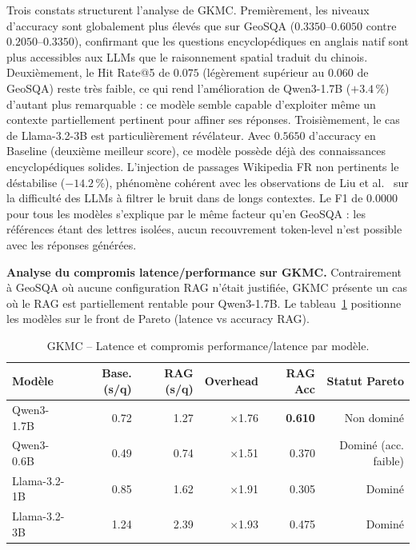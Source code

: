 \documentclass[12pt,a4paper]{article}
\begin{document}
Trois constats structurent l'analyse de GKMC. Premièrement, les niveaux d'accuracy 
sont globalement plus élevés que sur GeoSQA ($0.3350$--$0.6050$ contre 
$0.2050$--$0.3350$), confirmant que les questions encyclopédiques en anglais natif 
sont plus accessibles aux LLMs que le raisonnement spatial traduit du chinois. 
Deuxièmement, le Hit Rate@5 de $0.075$ (légèrement supérieur au $0.060$ de GeoSQA) 
reste très faible, ce qui rend l'amélioration de Qwen3-1.7B ($+3.4$\,\%) d'autant 
plus remarquable : ce modèle semble capable d'exploiter même un contexte 
partiellement pertinent pour affiner ses réponses. Troisièmement, le cas de 
Llama-3.2-3B est particulièrement révélateur. Avec $0.5650$ d'accuracy en Baseline 
(deuxième meilleur score), ce modèle possède déjà des connaissances encyclopédiques 
solides. L'injection de passages Wikipedia FR non pertinents le déstabilise 
($-14.2$\,\%), phénomène cohérent avec les observations de Liu et al.~\cite{liu2023lost} 
sur la difficulté des LLMs à filtrer le bruit dans de longs contextes. Le F1 de 
$0.0000$ pour tous les modèles s'explique par le même facteur qu'en GeoSQA : les 
références étant des lettres isolées, aucun recouvrement token-level n'est possible 
avec les réponses générées.

\medskip

\noindent\textbf{Analyse du compromis latence/performance sur GKMC.}
Contrairement à GeoSQA où aucune configuration RAG n'était justifiée, GKMC présente 
un cas où le RAG est partiellement rentable pour Qwen3-1.7B. Le 
tableau~\ref{tab:pareto_gkmc} positionne les modèles sur le front de Pareto 
(latence vs accuracy RAG).

\begin{table}[H]
\centering
\small
\caption{GKMC -- Latence et compromis performance/latence par modèle.}
\label{tab:pareto_gkmc}
\begin{tabular}{lrrrrr}
\toprule
\textbf{Modèle} & \textbf{Base. (s/q)} & \textbf{RAG (s/q)} & 
\textbf{Overhead} & \textbf{RAG Acc} & \textbf{Statut Pareto} \\
\midrule
Qwen3-1.7B   & 0.72 & 1.27 & $\times$1.76 & \textbf{0.610} & Non dominé \\
Qwen3-0.6B   & 0.49 & 0.74 & $\times$1.51 & 0.370 & Dominé (acc. faible) \\
Llama-3.2-1B & 0.85 & 1.62 & $\times$1.91 & 0.305 & Dominé \\
Llama-3.2-3B & 1.24 & 2.39 & $\times$1.93 & 0.475 & Dominé \\
\bottomrule
\end{tabular}
\end{table}
\end{document}
